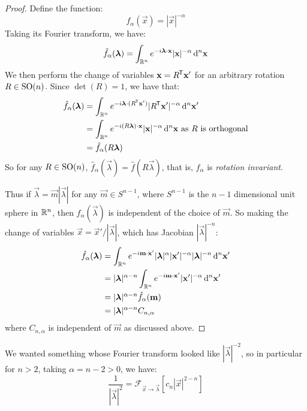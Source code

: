 \documentclass[../main.tex]{subfiles}
\begin{document}
\begin{proof}
  Define the function:
  \[
    f_{\alpha}(\vec{x}) = |\vec{x}|^{-\alpha}
  \]
  Taking its Fourier transform, we have:
  \[
    \hat{f}_{\alpha}(\vec{\lambda}) = \int_{\R^{n}} e^{-i \vec{\lambda} \cdot \vec{x}} |\vec{x}|^{-\alpha} \d^{n}{\vec{x}}
  \]
  We then perform the change of variables $\mathbf{\bm{x}} = R^{{\mkern-1.5mu\mathsf{T}}} \mathbf{\bm{x}}'$ for an arbitrary rotation $R \in \mathrm{SO}(n)$.
  Since $\det(R) = 1$, we have that:
  \begin{align*}
    \hat{f}_{\alpha}(\vec{\lambda}) & = \int_{\R^{n}} e^{-i \vec{\lambda} \cdot (R^{\trans} \vec{x}')} |R^{\trans} \vec{x}'|^{-\alpha} \d^{n}{\vec{x}'} \\
                                    &= \int_{\R^{n}} e^{-i (R \vec{\lambda}) \cdot \vec{x}} |\vec{x}|^{-\alpha} \d^{n}{\vec{x}} \text{ as $R$ is orthogonal} \\
                                    &= \hat{f}_{\alpha}(R \vec{\lambda})
  \end{align*}
  So for any $R \in \mathrm{SO}(n)$, $\hat{f}_{\alpha}(\vec{\lambda}) = \hat{f}(R \vec{\lambda})$, that is, $\hat{f}_\alpha$ is \textit{rotation invariant}.

  Thus if $\vec{\lambda} = \vec{m} |\vec{\lambda}|$ for any $\vec{m} \in S^{n - 1}$, where $S^{n - 1}$ is the $n - 1$ dimensional unit sphere in $\mathbb{R}^{n}$, then $f_{\alpha}(\vec{\lambda})$ is independent of the choice of $\vec{m}$.
  So making the change of variables $\vec{x} = \vec{x}'/|\vec{\lambda}|$, which has Jacobian $|\vec{\lambda}|^{-n}$:
  \begin{align*}
    \hat{f}_{\alpha}(\vec{\lambda}) &= \int_{\R^{n}} e^{-i \vec{m} \cdot \vec{x}'} |\vec{\lambda}|^{\alpha} |\vec{x}'|^{-\alpha} |\vec{\lambda}|^{-n} \d^{n}{\vec{x}'}  \\
                                    &= |\vec{\lambda}|^{\alpha - n} \int_{\R^{n}} e^{-i \vec{m} \cdot \vec{x}'} |\vec{x}'|^{-\alpha} \d^{n}{\vec{x}'} \\
                                    &= |\vec{\lambda}|^{\alpha - n} \hat{f}_{\alpha}(\vec{m}) \\
                                    &= |\vec{\lambda}|^{\alpha - n} C_{n, \alpha}
  \end{align*}
  where $C_{n, \alpha}$ is independent of $\vec{m}$ as discussed above.
\end{proof}
We wanted something whose Fourier transform looked like $|\vec{\lambda}|^{-2}$, so in particular for $n > 2$, taking $\alpha = n - 2 > 0$, we have:
\begin{equation}
  \frac{1}{|\vec{\lambda}|^2} = \mathcal{F}_{\vec{x} \to \vec{\lambda}}[c_n |\vec{x}|^{2 - n}] \label{particG}
\end{equation}
\end{document}
